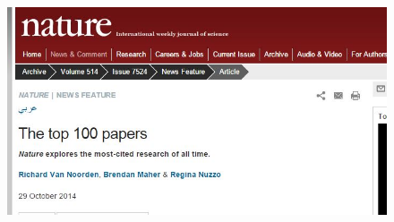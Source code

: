 \documentclass[compress]{beamer}        %
\begin{document}
		\begin{frame}
			\begin{figure}
				\centering
				\includegraphics[width=0.99\linewidth]{images/BACITENATURE}
				
				\label{fig:BACITENATURE}
			\end{figure}
			
		\end{frame}
		
\end{document}

